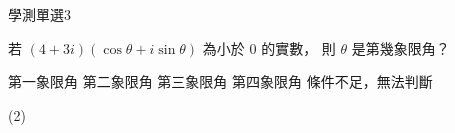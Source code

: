     \begin{QUESTION}
        \begin{ExamInfo}{92}{學測}{單選}{3}
        \end{ExamInfo}
        \begin{ExamAnsRateInfo}{41}{66}{36}{21}
        \end{ExamAnsRateInfo}
        \begin{QBODY}
            若 $(4 + 3i)(\cos \theta + i \sin \theta )$ 為小於 0 的實數， 則 $\theta$ 是第幾象限角？ 
            \begin{QOPS} 
                \QOP 第一象限角 
                \QOP 第二象限角 
                \QOP 第三象限角 
                \QOP 第四象限角 
                \QOP 條件不足，無法判斷
            \end{QOPS}
        \end{QBODY}
        \begin{QFROMS}
        \end{QFROMS}
        \begin{QTAGS}\end{QTAGS}
        \begin{QANS}
            (2)
        \end{QANS}
        \begin{QSOLLIST}
        \end{QSOLLIST}
        \begin{QEMPTYSPACE}
        \end{QEMPTYSPACE}
    \end{QUESTION}

